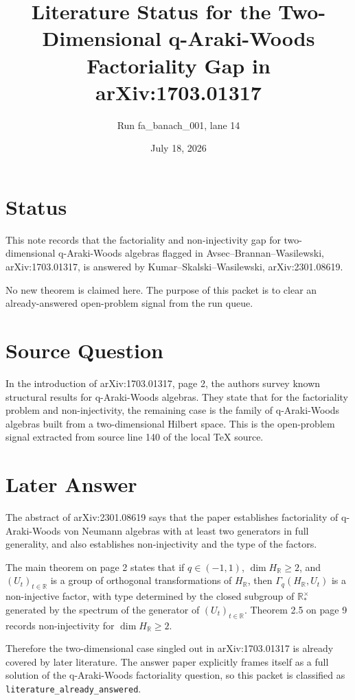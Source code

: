 \documentclass[11pt]{article}
\title{Literature Status for the Two-Dimensional q-Araki-Woods Factoriality Gap in arXiv:1703.01317}
\author{Run fa\_banach\_001, lane 14}
\date{July 18, 2026}
\newcommand{\Gammaq}{\Gamma_q}
\newcommand{\HR}{H_{\mathbb R}}
\begin{document}
\maketitle

\section*{Status}

This note records that the factoriality and non-injectivity gap for
two-dimensional q-Araki-Woods algebras flagged in Avsec--Brannan--Wasilewski,
arXiv:1703.01317, is answered by Kumar--Skalski--Wasilewski,
arXiv:2301.08619.

No new theorem is claimed here. The purpose of this packet is to clear an
already-answered open-problem signal from the run queue.

\section*{Source Question}

In the introduction of arXiv:1703.01317, page 2, the authors survey known
structural results for q-Araki-Woods algebras. They state that for the
factoriality problem and non-injectivity, the remaining case is the family of
q-Araki-Woods algebras built from a two-dimensional Hilbert space. This is the
open-problem signal extracted from source line 140 of the local TeX source.

\section*{Later Answer}

The abstract of arXiv:2301.08619 says that the paper establishes
factoriality of q-Araki-Woods von Neumann algebras with at least two
generators in full generality, and also establishes non-injectivity and the
type of the factors.

The main theorem on page 2 states that if $q\in(-1,1)$, $\dim \HR\geq 2$,
and $(U_t)_{t\in\mathbb R}$ is a group of orthogonal transformations of
$\HR$, then $\Gammaq(\HR,U_t)$ is a non-injective factor, with type determined
by the closed subgroup of $\mathbb R_*^\times$ generated by the spectrum of
the generator of $(U_t)_{t\in\mathbb R}$. Theorem 2.5 on page 9 records
non-injectivity for $\dim \HR\geq 2$.

Therefore the two-dimensional case singled out in arXiv:1703.01317 is already
covered by later literature. The answer paper explicitly frames itself as a
full solution of the q-Araki-Woods factoriality question, so this packet is
classified as \texttt{literature\_already\_answered}.
\end{document}
